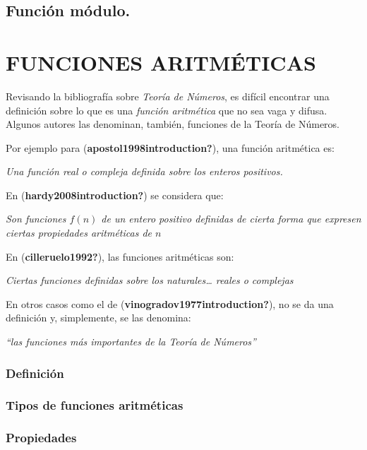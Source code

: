 \documentclass[
  letterpaper,
  DIV=11,
  numbers=noendperiod]{scrreprt}
\begin{document}
\hypertarget{funciuxf3n-muxf3dulo.}{%
\section{Función módulo.}\label{funciuxf3n-muxf3dulo.}}


\hypertarget{funciones-aritmuxe9ticas}{%
\chapter{FUNCIONES ARITMÉTICAS}\label{funciones-aritmuxe9ticas}}

Revisando la bibliografía sobre \emph{Teoría de Números}, es difícil
encontrar una definición sobre lo que es una \emph{función aritmética}
que no sea vaga y difusa. Algunos autores las denominan, también,
funciones de la Teoría de Números.

Por ejemplo para (\textbf{apostol1998introduction?}), una función
aritmética es:

\emph{Una función real o compleja definida sobre los enteros positivos.}

En (\textbf{hardy2008introduction?}) se considera que:

\emph{Son funciones \(f(n)\) de un entero positivo definidas de cierta
forma que expresen ciertas propiedades aritméticas de \(n\)}

En (\textbf{cilleruelo1992?}), las funciones aritméticas son:

\emph{Ciertas funciones definidas sobre los naturales\ldots{} reales o
complejas}

En otros casos como el de (\textbf{vinogradov1977introduction?}), no se
da una definición y, simplemente, se las denomina:

\emph{``las funciones más importantes de la Teoría de Números''}

\hypertarget{definiciuxf3n}{%
\subsection{Definición}\label{definiciuxf3n}}

\hypertarget{tipos-de-funciones-aritmuxe9ticas}{%
\subsection{Tipos de funciones
aritméticas}\label{tipos-de-funciones-aritmuxe9ticas}}

\hypertarget{propiedades-1}{%
\subsection{Propiedades}\label{propiedades-1}}
\end{document}
